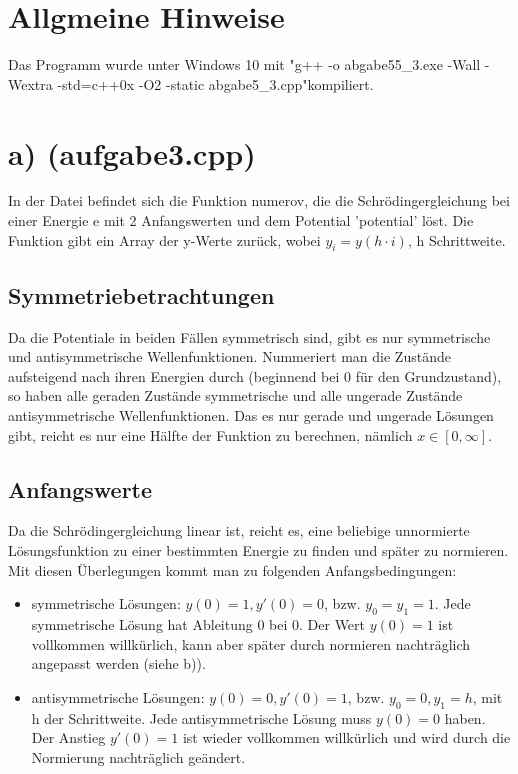 \documentclass{scrreprt}
\begin{document}
\section*{Allgmeine Hinweise}
Das Programm wurde unter Windows 10 mit "g++ -o abgabe55\_3.exe -Wall -Wextra -std=c++0x -O2 -static abgabe5\_3.cpp"\;kompiliert.

\section*{a) (aufgabe3.cpp)}
In der Datei befindet sich die Funktion numerov, die die Schrödingergleichung bei einer Energie e mit 2 Anfangswerten und dem Potential 'potential' löst. Die Funktion gibt ein Array der y-Werte zurück, wobei $y_i = y(h \cdot i)$, h Schrittweite.

\subsection*{Symmetriebetrachtungen}
Da die Potentiale in beiden Fällen symmetrisch sind, gibt es nur symmetrische und antisymmetrische Wellenfunktionen. Nummeriert man die Zustände aufsteigend nach ihren Energien durch (beginnend bei 0 für den Grundzustand), so haben alle geraden Zustände symmetrische und alle ungerade Zustände antisymmetrische Wellenfunktionen. Das es nur gerade und ungerade Lösungen gibt, reicht es nur eine Hälfte der Funktion zu berechnen, nämlich $x\in [0,\infty]$.\\

\subsection*{Anfangswerte}
Da die Schrödingergleichung linear ist, reicht es, eine beliebige unnormierte Lösungsfunktion zu einer bestimmten Energie zu finden und später zu normieren.
Mit diesen Überlegungen kommt man zu folgenden Anfangsbedingungen:
\begin{itemize}
	\item symmetrische Lösungen: $y(0) = 1, y'(0)=0$, bzw. $y_0 = y_1 = 1$. Jede symmetrische Lösung hat Ableitung 0 bei 0. Der Wert $y(0) = 1$ ist vollkommen willkürlich, kann aber später durch normieren nachträglich angepasst werden (siehe b)).
	\item antisymmetrische Lösungen: $y(0) = 0, y'(0) = 1$, bzw. $y_0 = 0, y_1 = h$, mit h der Schrittweite. Jede antisymmetrische Lösung muss $y(0) = 0$ haben. Der Anstieg $y'(0) = 1$ ist wieder vollkommen willkürlich und wird durch die Normierung nachträglich geändert. 
\end{itemize}
\end{document}
